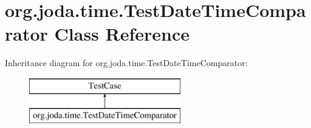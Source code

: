 \hypertarget{classorg_1_1joda_1_1time_1_1_test_date_time_comparator}{\section{org.\-joda.\-time.\-Test\-Date\-Time\-Comparator Class Reference}
\label{classorg_1_1joda_1_1time_1_1_test_date_time_comparator}
}
Inheritance diagram for org.\-joda.\-time.\-Test\-Date\-Time\-Comparator\-:\begin{figure}[H]
\begin{center}
\leavevmode
\includegraphics[height=2.000000cm]{classorg_1_1joda_1_1time_1_1_test_date_time_comparator}
\end{center}
\end{figure}
